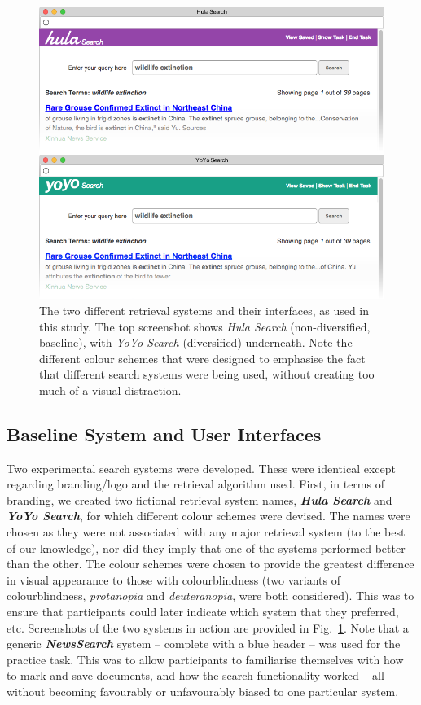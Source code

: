 \begin{figure}[t!]
\includegraphics[width=1.0\columnwidth]{figures/interface-both.png}
\caption{The two different retrieval systems and their interfaces, as used in this study. The top screenshot shows \emph{Hula Search} (non-diversified, baseline), with \emph{YoYo Search} (diversified) underneath. Note the different colour schemes that were designed to emphasise the fact that different search systems were being used, without creating too much of a visual distraction.
} 
\label{fig_systems}
\end{figure}

\subsection{Baseline System and User Interfaces}\label{sec:method:systems}
Two experimental search systems were developed. These were identical except regarding branding/logo and the retrieval algorithm used. First, in terms of branding, we created two fictional retrieval system names,
\textbf{\emph{Hula Search}} and \textbf{\emph{YoYo Search}}, for which different colour schemes were devised. The names were chosen as they were not associated with any major retrieval system (to the best of our knowledge), nor did they imply that one of the systems performed better than the other. The colour schemes were chosen to provide the greatest difference in visual appearance to those with colourblindness (two variants of colourblindness, \emph{protanopia} and \emph{deuteranopia}, were both considered). This was to ensure that participants could later indicate which system that they preferred, etc. Screenshots of the two systems in action are provided in Fig.~\ref{fig_systems}. 
Note that a generic \textbf{\emph{NewsSearch}} system -- complete with a blue header -- was used for the practice task. This was to allow participants to familiarise themselves with how to mark and save documents, and how the search functionality worked -- all without becoming favourably or unfavourably biased to one particular system.

